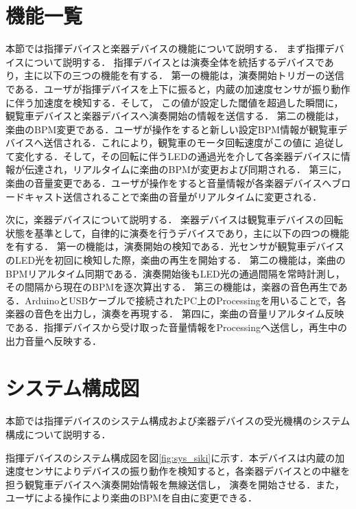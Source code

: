 \documentclass[lualatex,book,paper=a4paper,jafontsize=11.5pt,jafontscale=1.05,openany]{jlreq}
\begin{document}
\section{機能一覧}
本節では指揮デバイスと楽器デバイスの機能について説明する．
まず指揮デバイスについて説明する．
指揮デバイスとは演奏全体を統括するデバイスであり，主に以下の三つの機能を有する．
第一の機能は，演奏開始トリガーの送信である．ユーザが指揮デバイスを上下に振ると，内蔵の加速度センサが振り動作に伴う加速度を検知する．そして，
この値が設定した閾値を超過した瞬間に，観覧車デバイスと楽器デバイスへ演奏開始の情報を送信する．
第二の機能は，楽曲のBPM変更である．ユーザが操作をすると新しい設定BPM情報が観覧車デバイスへ送信される．これにより，観覧車のモータ回転速度がこの値に
追従して変化する．そして，その回転に伴うLEDの通過光を介して各楽器デバイスに情報が伝達され，リアルタイムに楽曲のBPMが変更および同期される．
第三に，楽曲の音量変更である．ユーザが操作をすると音量情報が各楽器デバイスへブロードキャスト送信されることで楽曲の音量がリアルタイムに変更される．\par

次に，楽器デバイスについて説明する．
楽器デバイスは観覧車デバイスの回転状態を基準として，自律的に演奏を行うデバイスであり，主に以下の四つの機能を有する．
第一の機能は，演奏開始の検知である．光センサが観覧車デバイスのLED光を初回に検知した際，楽曲の再生を開始する．
第二の機能は，楽曲のBPMリアルタイム同期である．演奏開始後もLED光の通過間隔を常時計測し，その間隔から現在のBPMを逐次算出する．
第三の機能は，楽器の音色再生である．ArduinoとUSBケーブルで接続されたPC上のProcessingを用いることで，各楽器の音色を出力し，演奏を再現する．
第四に，楽曲の音量リアルタイム反映である．指揮デバイスから受け取った音量情報をProcessingへ送信し，再生中の出力音量へ反映する．



\section{システム構成図}
本節では指揮デバイスのシステム構成および楽器デバイスの受光機構のシステム構成について説明する．

指揮デバイスのシステム構成図を図\ref{fig:sys_siki}に示す．本デバイスは内蔵の加速度センサによりデバイスの振り動作を検知すると，各楽器デバイスとの中継を担う観覧車デバイスへ演奏開始情報を無線送信し，
演奏を開始させる．また，ユーザによる操作により楽曲のBPMを自由に変更できる．
\end{document}
